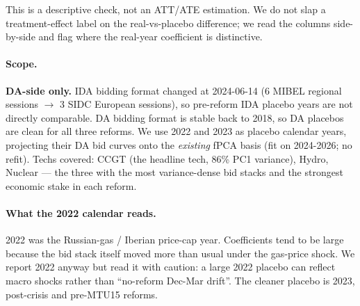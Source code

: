 \documentclass[11pt,a4paper]{article}
\begin{document}
This is a descriptive check, not an ATT/ATE estimation. We do not slap a treatment-effect label on the real-vs-placebo difference; we read the columns side-by-side and flag where the real-year coefficient is distinctive.

\paragraph{Scope.} \textbf{DA-side only.} IDA bidding format changed at 2024-06-14 (6 MIBEL regional sessions $\to$ 3 SIDC European sessions), so pre-reform IDA placebo years are not directly comparable. DA bidding format is stable back to 2018, so DA placebos are clean for all three reforms. We use 2022 and 2023 as placebo calendar years, projecting their DA bid curves onto the \emph{existing} fPCA basis (fit on 2024-2026; no refit). Techs covered: CCGT (the headline tech, 86\% PC1 variance), Hydro, Nuclear --- the three with the most variance-dense bid stacks and the strongest economic stake in each reform.

\paragraph{What the 2022 calendar reads.} 2022 was the Russian-gas / Iberian price-cap year. Coefficients tend to be large because the bid stack itself moved more than usual under the gas-price shock. We report 2022 anyway but read it with caution: a large 2022 placebo can reflect macro shocks rather than ``no-reform Dec-Mar drift''. The cleaner placebo is 2023, post-crisis and pre-MTU15 reforms.

\begin{table}[H]
\centering\scriptsize
\caption{\textbf{ISP15 pairwise PC1 coefficient, real (2024-25 calendar) vs placebos (2022 and 2023 calendars).} Critical hours only. Same specification as Table~\ref{tab:fpca_isp15}: post $+$ post$\times$hour-class $+$ month FE $+$ Fourier(doy, 3 harm.) $+$ DOW/HOD/quarter FE. Sample restricted to the relevant pre$+$post window in each year. Positive $=$ bid curve shifts up under the reform direction.}
\label{tab:fpca_placebo_isp15}
\setlength{\tabcolsep}{4pt}

\end{table}

\begin{table}[H]
\centering\scriptsize
\caption{\textbf{MTU15-IDA pairwise PC1 coefficient, real vs placebos.} Critical hours only. 40-day post window so estimates are less precise than ISP15 / MTU15-DA.}
\label{tab:fpca_placebo_id15}
\setlength{\tabcolsep}{4pt}

\end{table}
\end{document}
